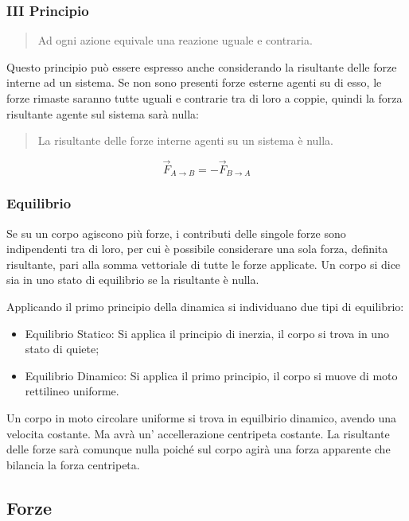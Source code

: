 \documentclass{article}
\numberwithin{equation}{subsection}
\begin{document}
\subsubsection{III Principio}

\begin{quotation}
    Ad ogni azione equivale una reazione uguale e contraria.
\end{quotation}

Questo principio può essere espresso anche considerando la risultante 
delle forze interne ad un sistema. Se non sono presenti 
forze esterne agenti su di esso, le forze rimaste saranno 
tutte uguali e contrarie tra di loro a coppie, quindi la 
forza risultante agente sul sistema sarà nulla:

\begin{quotation}
    La risultante delle forze interne agenti su un sistema è nulla.
\end{quotation}

\begin{equation}
    \vec{F}_{A\to B}=-\vec{F}_{B\to A}
\end{equation}

\subsubsection{Equilibrio}
Se su un corpo agiscono più forze, i contributi delle singole forze sono indipendenti tra di loro, per cui è possibile considerare una sola forza, definita risultante, pari 
alla somma vettoriale di tutte le forze applicate. Un corpo si dice sia in uno stato di equilibrio se la 
risultante è nulla. 

Applicando 
il primo principio della dinamica si individuano due tipi di 
equilibrio:
\begin{itemize}
    \item Equilibrio Statico: Si applica il principio di inerzia, 
    il corpo si trova in uno stato di quiete;
    \item Equilibrio Dinamico: Si applica il primo principio, 
    il corpo si muove di moto rettilineo uniforme.
\end{itemize}

Un corpo in moto circolare uniforme si trova in equilbirio 
dinamico, avendo una velocita costante. Ma avrà un'
accellerazione centripeta costante. La risultante delle forze sarà 
comunque nulla poiché sul corpo agirà una forza apparente che 
bilancia la forza centripeta.
 
\subsection{Forze}
\end{document}
